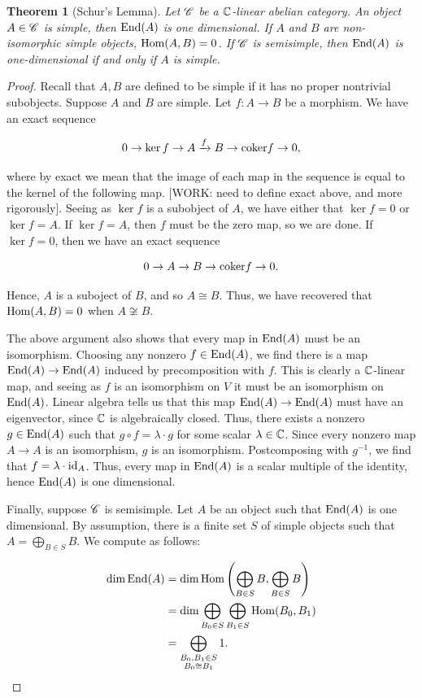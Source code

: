 \documentclass{article}
\newtheorem{theorem}{Theorem}[section]
\theoremstyle{definition}
\numberwithin{figure}{section}
\begin{document}
\begin{theorem}[Schur's Lemma]\label{Schurs Lemma} Let $\mathscr{C}$ be a $\mathbb{C}$-linear abelian category. An object $A\in \mathscr{C}$ is simple, then $\mathrm{End}(A)$ is one dimensional. If $A$ and $B$ are non-isomorphic simple objects, $\mathrm{Hom}(A,B)=0$. If $\mathscr{C}$ is semisimple, then $\mathrm{End}(A)$ is one-dimensional if and only if $A$ is simple.
\end{theorem}
\begin{proof} Recall that $A,B$ are defined to be simple if it has no proper nontrivial subobjects. Suppose $A$ and $B$ are simple. Let $f:A\to B$ be a morphism. We have an exact sequence

$$0\to \ker f \to A\xrightarrow{f} B\to \mathrm{coker} f\to 0,$$

where by exact we mean that the image of each map in the sequence is equal to the kernel of the following map. [WORK: need to define exact above, and more rigorously]. Seeing as $\ker f$ is a subobject of $A$, we have either that $\ker f= 0$ or $\ker f = A$. If $\ker f = A$, then $f$ must be the zero map, so we are done. If $\ker f =0$, then we have an exact sequence

$$0\to A\to B\to \mathrm{coker} f\to 0.$$

Hence, $A$ is a suboject of $B$, and so $A\cong B$. Thus, we have recovered that $\mathrm{Hom}(A,B)=0$ when $A\not\cong B$.

The above argument also shows that every map in $\mathrm{End}(A)$ must be an isomorphism. Choosing any nonzero $f\in \mathrm{End}(A)$, we find there is a map $\mathrm{End}(A)\to \mathrm{End}(A)$ induced by precomposition with $f$. This is clearly a $\mathbb{C}$-linear map, and seeing as $f$ is an isomorphism on $V$ it must be an isomorphism on $\mathrm{End}(A)$. Linear algebra tells us that this map $\mathrm{End}(A)\to \mathrm{End}(A)$ must have an eigenvector, since $\mathbb{C}$ is algebraically closed. Thus, there exists a nonzero $g\in \mathrm{End}(A)$ such that $g\circ f=\lambda \cdot g$ for some scalar $\lambda\in \mathbb{C}$. Since every nonzero map $A\to A$ is an isomorphism, $g$ is an isomorphism. Postcomposing with $g^{-1}$, we find that $f=\lambda \cdot\mathrm{id}_A$. Thus, every map in $\mathrm{End}(A)$ is a scalar multiple of the identity, hence $\mathrm{End}(A)$ is one dimensional.

Finally, suppose $\mathscr{C}$ is semisimple. Let $A$ be an object such that $\mathrm{End}(A)$ is one dimensional. By assumption, there is a finite set $S$ of simple objects such that $A=\bigoplus_{B\in S}B$. We compute as follows:

\begin{align*}
\dim \mathrm{End}(A)&=\dim \mathrm{Hom}\left(\bigoplus_{B\in S}B,\bigoplus_{B\in S} B\right)\\
&=\dim \bigoplus_{B_0 \in S}\bigoplus_{B_1\in S}\mathrm{Hom}(B_0,B_1)\\
&=\bigoplus_{\substack{B_0,B_1\in S \\ B_0\cong B_1}}1.
\end{align*}


\end{proof}
\end{document}
